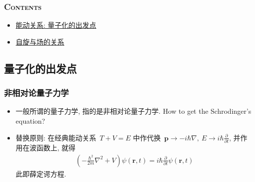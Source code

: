 \documentclass[aspectratio=169, 10pt, utf8, mathserif]{beamer}
\def\hilite<#1>{\temporal<#1>{\color{blue!80}}{\color{blue!85!white}}{\color{black}}}%
\numberwithin{equation}{section} %
\numberwithin{figure}{section} %
\begin{document}
\begin{frame}%
    \frametitle{\textsc{Contents}} \vspace{-0.85cm}\label{sec:5}
    \begin{multicols}{2}
    \begin{minipage}[t]{0.55\textwidth}
    \end{minipage}

    \begin{minipage}[t]{0.55\textwidth}
    \vspace{1.1cm}
    \begin{spacing}{1.05} %
    \begin{itemize}
        \item\hyperlink{subsec:5-1}{能动关系: 量子化的出发点}
        \item\hyperlink{subsec:5-2}{自旋与场的关系}
    \end{itemize}
    \end{spacing}
    \end{minipage}
    \end{multicols}
\end{frame}
\subsection[量子化的出发点]{量子化的出发点}\label{subsec:5-1}


\begin{frame}
\frametitle{\textsc{非相对论量子力学}}
\begin{itemize}
\hilite<1>\item 一般所谓的量子力学, 指的是非相对论量子力学. How to get the Schrodinger's equation?\pause
\hilite<2>\item 替换原则: 在经典能动关系~$T+V=E$ 中作代换~$\bm{p}\rightarrow -i\hbar\nabla,~E\rightarrow i\hbar\frac{\partial}{\partial t}$, 并作用在波函数上, 就得
\begin{align}
\left(-\frac{\hbar^2}{2m}\nabla^2+V\right)\psi(\bm{r},t)=i\hbar\frac{\partial}{\partial t}\psi(\bm{r},t)
\end{align}
此即薛定谔方程.
\end{itemize}

\end{frame}
\end{document}
